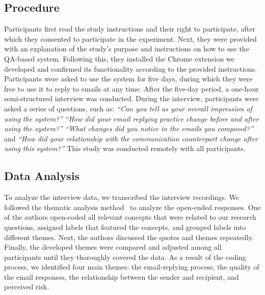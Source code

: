 \subsection{Procedure}
Participants first read the study instructions and their right to participate, after which they consented to participate in the experiment. 
Next, they were provided with an explanation of the study's purpose and instructions on how to use the QA-based system. 
Following this, they installed the Chrome extension we developed and confirmed its functionality according to the provided instructions.
Participants were asked to use the system for five days, during which they were free to use it to reply to emails at any time. 
After the five-day period, a one-hour semi-structured interview was conducted. 
During the interview, participants were asked a series of questions, such as: \textit{``Can you tell us your overall impression of using the system?''} \textit{``How did your email replying practice change before and after using the system?''} \textit{``What changes did you notice in the emails you composed?''} and \textit{``How did your relationship with the communication counterpart change after using this system?''}
This study was conducted remotely with all participants.

\subsection{Data Analysis}
To analyze the interview data, we transcribed the interview recordings. 
We followed the thematic analysis method~\cite{braun_2006_thematicanalysis} to analyze the open-ended responses. 
One of the authors open-coded all relevant concepts that were related to our research questions, assigned labels that featured the concepts, and grouped labels into different themes. 
Next, the authors discussed the quotes and themes repeatedly.
Finally, the developed themes were compared and adjusted among all participants until they thoroughly covered the data.
As a result of the coding process, we identified four main themes: the email-replying process, the quality of the email responses, the relationship between the sender and recipient, and perceived risk.